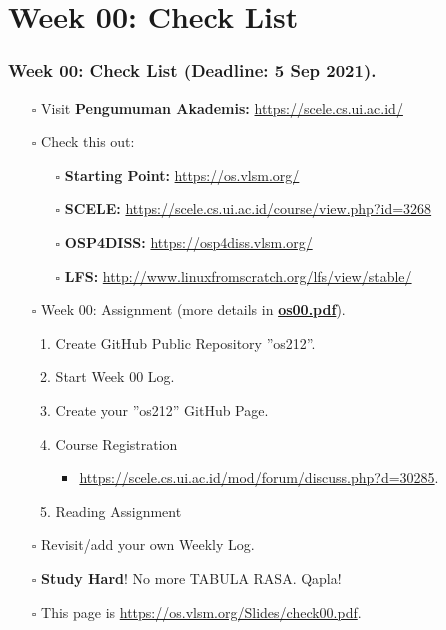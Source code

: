 

\section{Week 00: Check List}
\begin{frame}
\frametitle{Week 00: Check List (Deadline: 5 Sep 2021).}
\begin{itemize}
\item [$\square$] Visit \textbf{Pengumuman Akademis:} \url{https://scele.cs.ui.ac.id/}
\item [$\square$] Check this out: 
\begin{itemize}
\item [$\square$] \textbf{Starting Point:} \url{https://os.vlsm.org/}
\item [$\square$] \textbf{SCELE:} \url{https://scele.cs.ui.ac.id/course/view.php?id=3268}
\item [$\square$] \textbf{OSP4DISS:} \url{https://osp4diss.vlsm.org/}
\item [$\square$] \textbf{LFS:} \url{http://www.linuxfromscratch.org/lfs/view/stable/}
\end{itemize}
\item [$\square$] Week 00: Assignment (more details in \href{https://os.vlsm.org/Slides/os00.pdf}{\textbf{os00.pdf}}).
\begin{enumerate}
\item Create GitHub Public Repository ''os212''.
\item Start Week 00 Log.
\item Create your ''os212'' GitHub Page.
\item Course Registration
\begin{itemize}
\item \url{https://scele.cs.ui.ac.id/mod/forum/discuss.php?d=30285}.
\end{itemize}
\item Reading Assignment
\end{enumerate}
\item [$\square$] Revisit/add your own Weekly Log.
\item [$\square$] \textbf{Study Hard}! No more TABULA RASA. Qapla!
\item [$\square$] This page is \url{https://os.vlsm.org/Slides/check00.pdf}.
\end{itemize}
\end{frame}

